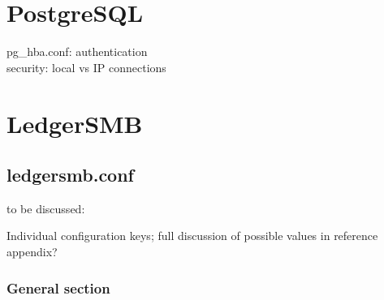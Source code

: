 \section{PostgreSQL}
\label{sec-global-config-postgresql}

pg\_hba.conf: authentication \\
security: local vs IP connections \\




\section{LedgerSMB}
\label{sec-global-config-ledgersmb}

\subsection{ledgersmb.conf}
\label{subsec-global-config-ledgersmb-conf}

to be discussed:

Individual configuration keys; full discussion of possible values in reference appendix?

\subsubsection{General section}
\label{subsubsec-global-config-ledgersmb-conf-general}


